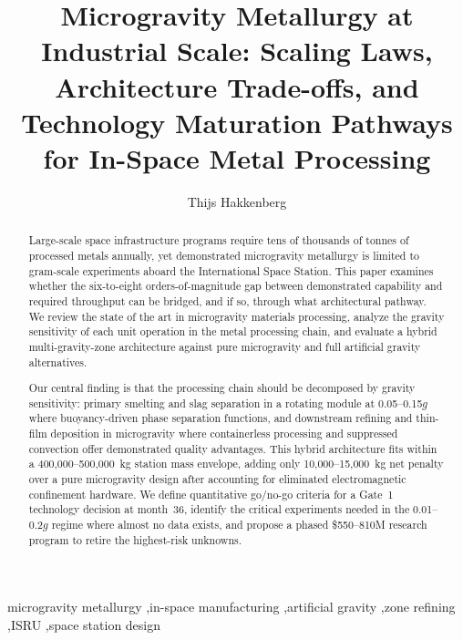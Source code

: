 \documentclass[preprint,12pt]{elsarticle}
\begin{document}
\begin{frontmatter}

\title{Microgravity Metallurgy at Industrial Scale: Scaling Laws, Architecture Trade-offs, and Technology Maturation Pathways for In-Space Metal Processing}

\author[dyson]{Thijs Hakkenberg}

\address[dyson]{Project Dyson, Open Research Initiative}

\begin{abstract}
Large-scale space infrastructure programs require tens of thousands of tonnes of processed metals annually, yet demonstrated microgravity metallurgy is limited to gram-scale experiments aboard the International Space Station. This paper examines whether the six-to-eight orders-of-magnitude gap between demonstrated capability and required throughput can be bridged, and if so, through what architectural pathway. We review the state of the art in microgravity materials processing, analyze the gravity sensitivity of each unit operation in the metal processing chain, and evaluate a hybrid multi-gravity-zone architecture against pure microgravity and full artificial gravity alternatives.

Our central finding is that the processing chain should be decomposed by gravity sensitivity: primary smelting and slag separation in a rotating module at 0.05--0.15$g$ where buoyancy-driven phase separation functions, and downstream refining and thin-film deposition in microgravity where containerless processing and suppressed convection offer demonstrated quality advantages. This hybrid architecture fits within a 400,000--500,000~kg station mass envelope, adding only 10,000--15,000~kg net penalty over a pure microgravity design after accounting for eliminated electromagnetic confinement hardware. We define quantitative go/no-go criteria for a Gate~1 technology decision at month~36, identify the critical experiments needed in the 0.01--0.2$g$ regime where almost no data exists, and propose a phased \$550--810M research program to retire the highest-risk unknowns.
\end{abstract}

\begin{keyword}
microgravity metallurgy \sep in-space manufacturing \sep artificial gravity \sep zone refining \sep ISRU \sep space station design
\end{keyword}

\end{frontmatter}
\end{document}
